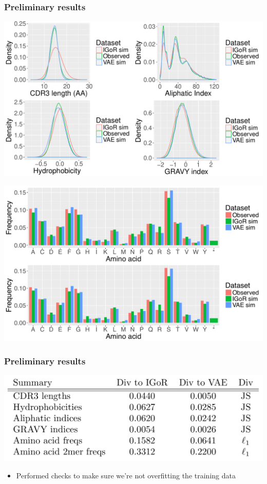 \documentclass[mathserif,compress]{beamer}
\renewcommand\;{\,}
\begin{document}
\begin{frame}\frametitle{Preliminary results}
\begin{center}
\includegraphics[width=0.8\linewidth]{Images/physiochem.pdf}
\end{center}
\begin{center}
\includegraphics[width=0.8\linewidth]{Images/aa.pdf}
\end{center}
\end{frame}

\begin{frame}\frametitle{Preliminary results}

\begin{center}
\includegraphics[width=\linewidth]{Images/DivTable.png}
\end{center}

\begin{itemize}
\item
Performed checks to make sure we're not overfitting the training data 
\end{itemize}
\end{frame}
\end{document}

